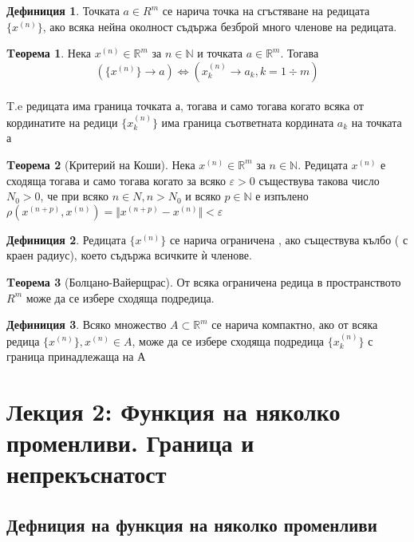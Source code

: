 \documentclass[a4paper,fleqn,12pt]{article}
\theoremstyle{definition}
\newtheorem{theorem}{Tеорема}[subsection]
\newtheorem{definition}{Дефиниция}[subsection]
\begin{document}
\begin{definition}
Точката $a \in R^m$ се нарича точка на сгъстяване на редицата $\{ x^{(n)} \}$, ако всяка нейна околност съдържа безброй много членове на редицата. 
\end{definition}

\begin{theorem}
Нека $x^{(n)} \in \mathbb{R}^m$ за $n \in \mathbb{N} $ и точката $a \in \mathbb{R}^m$. Тогава 
$$(\{x^{(n)}\} \to a )\iff (x_k ^{(n)} \to a_k, k = 1 \div m)$$\\
T.e редицата има граница точката а, тогава и само тогава когато всяка от кординатите на редици $\{x_k^{(n)}\}$ има граница съответната кордината $a_k$ на точката а
\end{theorem}

\begin{theorem}[Критерий на Коши]
Нека $x^{(n)} \in \mathbb{R}^m$ за $n \in \mathbb{N} $. Редицата $x^{(n)}$ е сходяща тогава и само тогава когато за всяко $\varepsilon > 0$ съществува такова число $N_0 > 0$, че при всяко $n \in N, n > N_0$ и всяко $p \in \mathbb{N}$ е изпълено $\rho(x^{(n+p)}, x^{(n)}) = \Vert x^{(n+p)} - x^{(n)} \Vert < \varepsilon$
\end{theorem}

\begin{definition}
Редицата $\{x^{(n)}\}$ се нарича ограничена , ако съществува кълбо ( с краен радиус), което съдържа всичките ѝ членове. 
\end{definition}


\begin{theorem}[Болцано-Вайерщрас]
От всяка ограничена редица в пространството $R^m$ може да се избере сходяща подредица. 
\end{theorem}


\begin{definition}
Всяко множество $A \subset \mathbb{R}^m $ се нарича компактно, ако от всяка редица $\{x^{(n)}\}, x^{(n)} \in A$, може да се избере сходяща подредица $\{x_k ^{(n)}\}$ с граница принадлежаща на А
\end{definition}

\newpage

\section{Лекция 2: Функция на няколко променливи. Граница и непрекъснатост}

\subsection{Дефниция на функция на няколко променливи}
\end{document}
